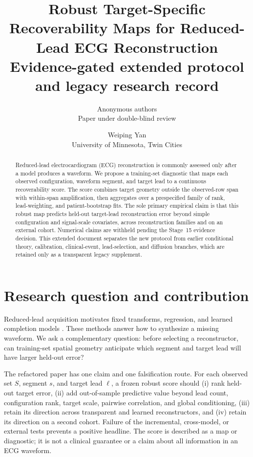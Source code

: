\documentclass[11pt]{article}
\title{\textbf{Robust Target-Specific Recoverability Maps for Reduced-Lead ECG
Reconstruction}\\[2pt]\large Evidence-gated extended protocol and legacy research record}
\author{Anonymous authors\\Paper under double-blind review}
\author{Weiping Yan\\University of Minnesota, Twin Cities}
\date{}
\begin{document}
\maketitle

\begin{abstract}
Reduced-lead electrocardiogram (ECG) reconstruction is commonly assessed only after a model
produces a waveform.  We propose a training-set diagnostic that maps each observed configuration,
waveform segment, and target lead to a continuous recoverability score.  The score combines target
geometry outside the observed-row span with within-span amplification, then aggregates over a
prespecified family of rank, lead-weighting, and patient-bootstrap fits.  The sole primary empirical
claim is that this robust map predicts held-out target-lead reconstruction error beyond simple
configuration and signal-scale covariates, across reconstruction families and on an external
cohort.  Numerical claims are withheld pending the Stage~15 evidence decision.  This extended
document separates the new protocol from earlier conditional theory, calibration, clinical-event,
lead-selection, and diffusion branches, which are retained only as a transparent legacy supplement.
\end{abstract}

\section{Research question and contribution}
Reduced-lead acquisition motivates fixed transforms, regression, and learned completion models
\cite{edenbrandt1988dower,kors1990vcg,nelwan2004reduced,gradowski2025reveals,%
cardoso2024bayesian,lence2025ecgrecover,fang2026imputeecg,pagotto2025minimal}.  These methods answer
how to synthesize a missing waveform.  We ask a complementary question: before selecting a
reconstructor, can training-set spatial geometry anticipate which segment and target lead will have
larger held-out error?

The refactored paper has one claim and one falsification route.  For each observed set $S$, segment
$s$, and target lead $\ell$, a frozen robust score should (i) rank held-out target error, (ii) add
out-of-sample predictive value beyond lead count, configuration rank, target scale, pairwise
correlation, and global conditioning, (iii) retain its direction across transparent and learned
reconstructors, and (iv) retain its direction on a second cohort.  Failure of the incremental,
cross-model, or external tests prevents a positive headline.  The score is described as a map or
diagnostic; it is not a clinical guarantee or a claim about all information in an ECG waveform.
\end{document}
